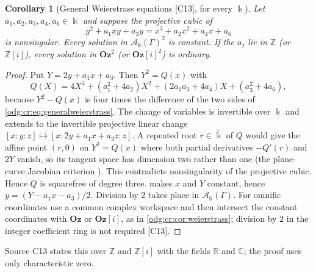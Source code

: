 \documentclass[11pt,oneside]{article}
\numberwithin{equation}{section}
\newtheorem{corollary}[corollary]{Corollary}
\theoremstyle{definition}
\theoremstyle{remark}
\newcommand{\Oz}{\mathbf{Oz}}
\newcommand{\Z}{\mathbb Z}
\newcommand{\R}{\mathbb R}
\newcommand{\C}{\mathbb C}
\newcommand{\src}[1]{\textup{\textsf{\small[#1]}}}
\newcommand{\Og}{\Oz[i]}
\newcommand{\crA}{\mathcal A_\Bbbk(\Gamma)}
\begin{document}
\begin{corollary}[General Weierstrass equations \src{C13}, for every $\Bbbk$]\label{odg:cr:cor:generalweierstrass}
Let $a_1,a_2,a_3,a_4,a_6\in\Bbbk$ and suppose the projective cubic of
\begin{equation}\label{odg:cr:eq:generalweierstrass}
 y^2+a_1xy+a_3y=x^3+a_2x^2+a_4x+a_6
\end{equation}
is nonsingular. Every solution in $\crA^2$ is constant. If the $a_j$ lie in $\Z$
(or $\Z[i]$), every solution in $\Oz^2$ (or $\Og^2$) is ordinary.
\end{corollary}
\begin{proof}
Put $Y=2y+a_1x+a_3$. Then $Y^2=Q(x)$ with
\[
 Q(X)=4X^3+(a_1^2+4a_2)X^2+(2a_1a_3+4a_4)X+(a_3^2+4a_6),
\]
because $Y^2-Q(x)$ is four times the difference of the two sides of
\eqref{odg:cr:eq:generalweierstrass}. The change of variables is invertible over
$\Bbbk$ and extends to the invertible projective linear change
$[x:y:z]\mapsto[x:2y+a_1x+a_3z:z]$. A repeated root $r\in\bar\Bbbk$ of $Q$
would give the affine point $(r,0)$ on $Y^2=Q(x)$ where both partial
derivatives $-Q'(r)$ and $2Y$ vanish, so its tangent space has dimension
two rather than one (the plane-curve Jacobian criterion
\cite[Section 53.9]{StacksPlane}). This contradicts nonsingularity of
the projective cubic. Hence $Q$ is squarefree of degree three.
 makes
$x$ and $Y$ constant, hence $y=(Y-a_1x-a_3)/2$. Division by $2$ takes place in
$\crA$. For omnific coordinates use a common complex workspace and then
intersect the constant coordinates with $\Oz$ or $\Og$, as in
\cref{odg:cr:cor:weierstrass}; division by $2$ in the integer coefficient
ring is not required \src{C13}.
\end{proof}

Source C13 states this over $\Z$ and $\Z[i]$ with the fields $\R$ and $\C$; the
proof uses only characteristic zero.
\end{document}
